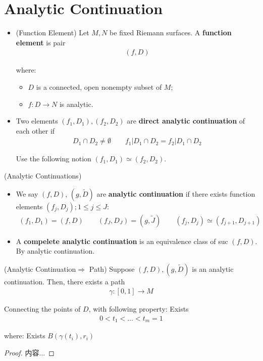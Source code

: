 \documentclass[Total.tex]{subfiles}
\begin{document}
		\section{Analytic Continuation}
			\begin{Def}
				\begin{itemize}
					\item (Function Element) Let $M,N$ be fixed Riemann surfaces. A \textbf{function element} is pair
					\begin{gather*}
						(f,D)
					\end{gather*}
					
					where:
					\begin{itemize}
						\item $D$ is a connected, open nonempty subset of $M$;
						\item $f:D\rightarrow N$ is analytic. 
					\end{itemize}
					
					\item Two elements $(f_1,D_1),(f_2,D_2)$ are \textbf{direct analytic continuation} of each other if
					\begin{gather*}
						D_1\cap D_2\not=\emptyset\qquad f_1|D_1\cap D_2=f_2|D_1\cap D_2
					\end{gather*}
					
					Use the following notion $(f_1,D_1)\simeq (f_2,D_2)$.
				\end{itemize}
			\end{Def}
			
			\begin{Def}
				(Analytic Continuations)
				\begin{itemize}
					\item We say $(f,D)$, $(g,\tilde{D})$ are \textbf{analytic continuation} if there exists function elements $(f_j,D_j);1\leq j\leq J$: 
					\begin{gather*}
						(f_1,D_1)=(f,D)\qquad (f_J,D_J)=(g,\tilde{J})\qquad (f_j,D_j)\simeq (f_{j+1},D_{j+1})
					\end{gather*}
					\item A \textbf{compelete analytic continuation} is an equivalence class of suc $(f,D)$. By analytic continuation.
				\end{itemize}
			\end{Def}
			
			\begin{lemma}
				(Analytic Continuation$\Rightarrow$ Path) Suppose $(f,D),(g,\tilde{D})$ is an analytic continuation. Then, there exists a path
				\begin{gather*}
					\gamma:[0,1]\rightarrow M
				\end{gather*}
				
				Connecting the points of $D$, with following property: Exists
				\begin{gather*}
					0<t_1<\dots<t_m=1
				\end{gather*}
				
				where: Exists $B(\gamma(t_i),r_i)$
			\end{lemma}
			\begin{proof}
				内容...
			\end{proof}
			
\end{document}
